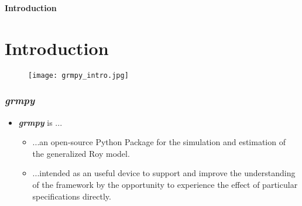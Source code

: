\begin{frame}\begin{center}
\LARGE\textbf{Introduction}
\end{center}\end{frame}

\section{Introduction}
\begin{frame}
\begin{figure}
  \texttt{[image: grmpy\_intro.jpg]}
\end{figure}
\end{frame}

\begin{frame}
\frametitle{\textit{grmpy}}

\begin{itemize}\setlength\itemsep{1em}
  \item \textit{\textbf{grmpy}} is ...
    \begin{itemize}\setlength\itemsep{1em}
      \item ...an open-source Python Package for the simulation and estimation of the generalized Roy model.
      \item ...intended as an useful device to support and improve the understanding of the framework by the opportunity to experience the effect of particular specifications directly.
    \end{itemize}
\end{itemize}
\end{frame}
